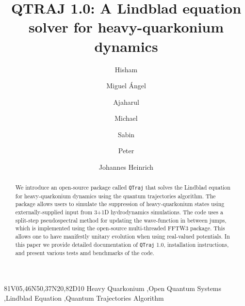 \documentclass[times,sort&compress,final]{elsarticle}
\def\qtraj{{\tt QTraj} }
\begin{document}

\begin{frontmatter}

\title{QTRAJ 1.0:  A Lindblad equation solver for heavy-quarkonium dynamics}

\author[1]{Hisham }
\author[2]{Miguel \'{A}ngel }
\author[1]{Ajaharul }
\author[1]{Michael 
}
\author[1]{Sabin }
\author[3]{Peter }
\author[4]{Johannes Heinrich }

\address[1]{Department of Physics, Kent State University, Kent, OH 44242, United States}
\address[2]{Instituto Galego de F\'{i}sica de Altas Enerx\'{i}as (IGFAE), Universidade de Santiago de Compostela. E-15782, Galicia, Spain}
\address[3]{Physik-Department, Technische Universit\"{a}t M\"{u}nchen, James-Franck-Str. 1, 85748 Garching,
Germany}
\address[4]{Institut f\"ur Physik, Humboldt-Universit\"at zu Berlin \& IRIS Adlershof, D-12489 Berlin, Germany}


\begin{abstract}
We introduce an open-source package called \qtraj that solves the Lindblad equation for heavy-quarkonium dynamics using the quantum trajectories algorithm.  
The package allows users to simulate the suppression of heavy-quarkonium states using externally-supplied input from 3+1D hydrodynamics simulations.
The code uses a split-step pseudospectral method for updating the wave-function in between jumps, which is implemented using the open-source multi-threaded FFTW3 package.  
This allows one to have manifestly unitary evolution when using real-valued potentials.  
In this paper we provide detailed documentation of \qtraj 1.0, installation instructions, and present various tests amd benchmarks of the code.
\end{abstract}

\begin{keyword}
\MSC 81V05\sep 46N50\sep 37N20\sep 82D10
\KWD Heavy Quarkonium \sep Open Quantum Systems \sep Lindblad Equation \sep Quantum Trajectories Algorithm
\end{keyword}

\end{frontmatter}
\end{document}
